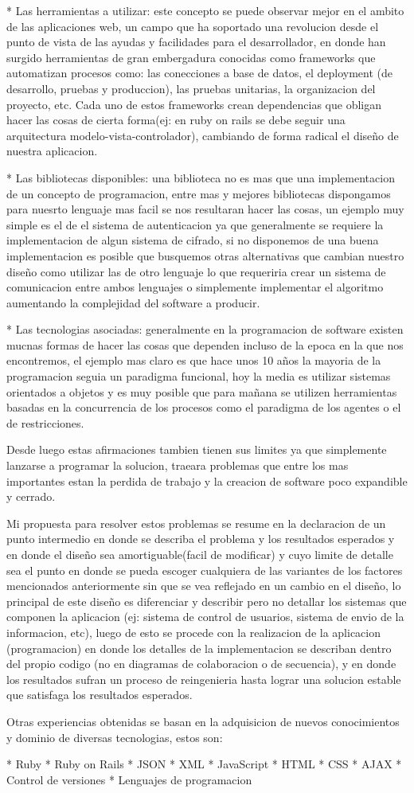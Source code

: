 * Las herramientas a utilizar: este concepto se puede observar mejor en el ambito de las aplicaciones web, un campo que ha soportado una revolucion desde el punto de vista de las ayudas y facilidades para el desarrollador, en donde han surgido herramientas de gran embergadura conocidas como frameworks que automatizan procesos como: las conecciones a base de datos, el deployment (de desarrollo, pruebas y produccion), las pruebas unitarias, la organizacion del proyecto, etc. Cada uno de estos frameworks crean dependencias que obligan hacer las cosas de cierta forma(ej: en ruby on rails se debe seguir una arquitectura modelo-vista-controlador), cambiando de forma radical el diseño de nuestra aplicacion.

* Las bibliotecas disponibles: una biblioteca no es mas que una implementacion de un concepto de programacion, entre mas y mejores bibliotecas dispongamos para nuesrto lenguaje mas facil se nos resultaran hacer las cosas, un ejemplo muy simple es el de el sistema de autenticacion ya que generalmente se requiere la implementacion de algun sistema de cifrado, si no disponemos de una buena implementacion es posible que busquemos otras alternativas que cambian nuestro diseño como utilizar las de otro lenguaje lo que requeriria crear un sistema de comunicacion entre ambos lenguajes o simplemente implementar el algoritmo aumentando la complejidad del software a producir.

* Las tecnologias asociadas: generalmente en la programacion de software existen mucnas formas de hacer las cosas que dependen incluso de la epoca en la que nos encontremos, el ejemplo mas claro es que hace unos 10 años la mayoria de la programacion seguia un paradigma funcional, hoy la media es utilizar sistemas orientados a objetos y es muy posible que para mañana se utilizen herramientas basadas en la concurrencia de los procesos como el paradigma de los agentes o el de restricciones.

Desde luego estas afirmaciones tambien tienen sus limites ya que simplemente lanzarse a programar la solucion, traeara problemas que entre los mas importantes estan la perdida de trabajo y la creacion de software poco expandible y cerrado.

Mi propuesta para resolver estos problemas se resume en la declaracion de un punto intermedio en donde se describa el problema y los resultados esperados y en donde el diseño sea amortiguable(facil de modificar) y cuyo limite de detalle sea el punto en donde se pueda escoger cualquiera de las variantes de los factores mencionados anteriormente sin que se vea reflejado en un cambio en el diseño, lo principal de este diseño es diferenciar y describir pero no detallar los sistemas que componen la aplicacion (ej: sistema de control de usuarios, sistema de envio de la informacion, etc), luego de esto se procede con la realizacion de la aplicacion (programacion) en donde los detalles de la implementacion se describan dentro del propio codigo (no en diagramas de colaboracion o de secuencia), y en donde los resultados sufran un proceso de reingenieria hasta lograr una solucion estable que satisfaga los resultados esperados.

Otras experiencias obtenidas se basan en la adquisicion de nuevos conocimientos y dominio de diversas tecnologias, estos son:

* Ruby
* Ruby on Rails
* JSON
* XML
* JavaScript
* HTML
* CSS
* AJAX
* Control de versiones
* Lenguajes de programacion
